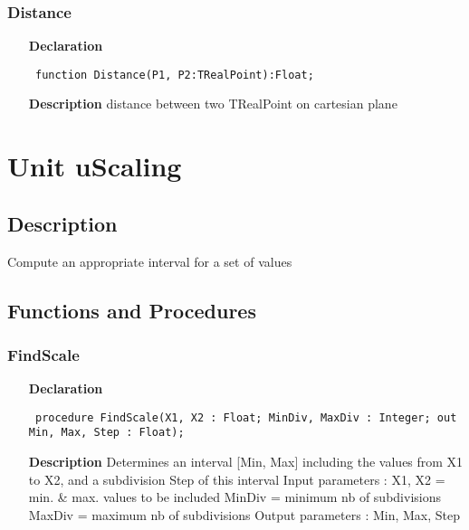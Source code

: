 \documentclass[12pt,a4paper,oneside]{report}
\newcommand{\declarationitem}[1]{\textbf{#1}}
\newcommand{\descriptiontitle}[1]{\textbf{#1}}
\newcommand{\code}[1]{\texttt{#1}}
\begin{document}
\subsubsection{Distance}
\label{uRealPoints-Distance}
\begin{itemize}\item[\declarationitem{Declaration}\hfill]
\begin{flushleft}
\code{
function Distance(P1, P2:TRealPoint):Float;}

\end{flushleft}

\par
\item[\descriptiontitle{Description}]
distance between two TRealPoint on cartesian plane
\end{itemize}

\section{Unit uScaling}
\label{uScaling}
\subsection{Description}
Compute an appropriate interval for a set of values \subsection{Functions and Procedures}
\subsubsection{FindScale}
\label{uScaling-FindScale}
\begin{itemize}\item[\declarationitem{Declaration}\hfill]
\begin{flushleft}
\code{
procedure FindScale(X1, X2 : Float; MinDiv, MaxDiv : Integer; out Min, Max, Step : Float);}

\end{flushleft}

\par
\item[\descriptiontitle{Description}]
Determines an interval [Min, Max] including the values from X1 to X2, and a subdivision Step of this interval Input parameters : X1, X2 = min. {\&} max. values to be included MinDiv = minimum nb of subdivisions MaxDiv = maximum nb of subdivisions Output parameters : Min, Max, Step

\end{itemize}
\end{document}
